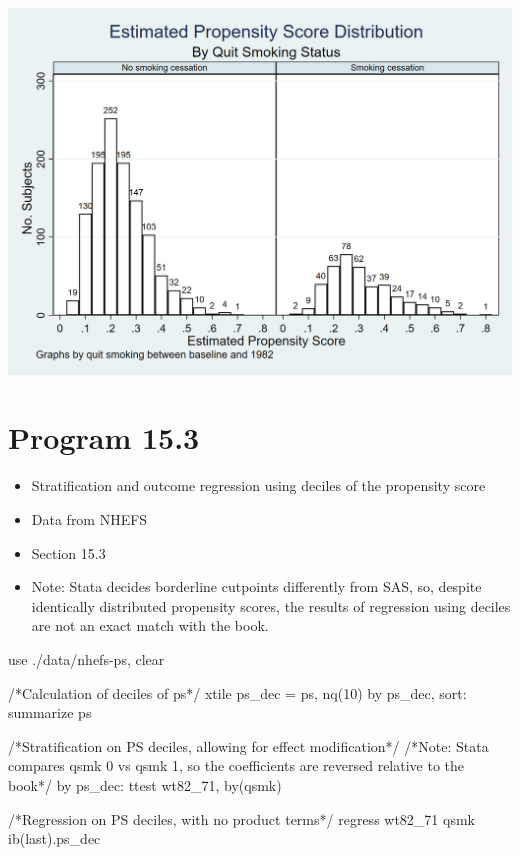 \documentclass[
  10pt,
  a4paper,
]{book}
\newenvironment{Shaded}{\begin{snugshade}}{\end{snugshade}}
\newcommand{\CommentTok}[1]{\textcolor[rgb]{0.37,0.37,0.37}{#1}}
\newcommand{\FunctionTok}[1]{\textcolor[rgb]{0.28,0.35,0.67}{#1}}
\newcommand{\KeywordTok}[1]{\textcolor[rgb]{0.00,0.46,0.62}{#1}}
\newcommand{\NormalTok}[1]{\textcolor[rgb]{0.00,0.46,0.62}{#1}}
\providecommand{\tightlist}{%
  \setlength{\itemsep}{0pt}\setlength{\parskip}{0pt}}
\begin{document}
\begin{center}\includegraphics[width=0.85\linewidth]{./figs/stata-fig-15-2} \end{center}

\hypertarget{program-15.3-1}{%
\section{Program 15.3}\label{program-15.3-1}}

\begin{itemize}
\tightlist
\item
  Stratification and outcome regression using deciles of the propensity score
\item
  Data from NHEFS
\item
  Section 15.3
\item
  Note: Stata decides borderline cutpoints differently from SAS, so, despite identically distributed propensity scores, the results of regression using deciles are not an exact match with the book.
\end{itemize}

\begin{Shaded}
\begin{Highlighting}[]
\KeywordTok{use}\NormalTok{ ./}\KeywordTok{data}\NormalTok{/nhefs{-}ps, }\KeywordTok{clear}

\CommentTok{/*Calculation of deciles of ps*/}
\KeywordTok{xtile}\NormalTok{ ps\_dec = ps, nq(10)}
\KeywordTok{by}\NormalTok{ ps\_dec, }\KeywordTok{sort}\NormalTok{: }\KeywordTok{summarize}\NormalTok{ ps}

\CommentTok{/*Stratification on PS deciles, allowing for effect modification*/}
\CommentTok{/*Note: Stata compares qsmk 0 vs qsmk 1, so the coefficients are reversed }
\CommentTok{relative to the book*/}
\KeywordTok{by}\NormalTok{ ps\_dec: }\KeywordTok{ttest}\NormalTok{ wt82\_71, }\KeywordTok{by}\NormalTok{(qsmk)}

\CommentTok{/*Regression on PS deciles, with no product terms*/}
\KeywordTok{regress}\NormalTok{ wt82\_71 qsmk ib(}\FunctionTok{last}\NormalTok{).ps\_dec}
\end{Highlighting}
\end{Shaded}
\end{document}
